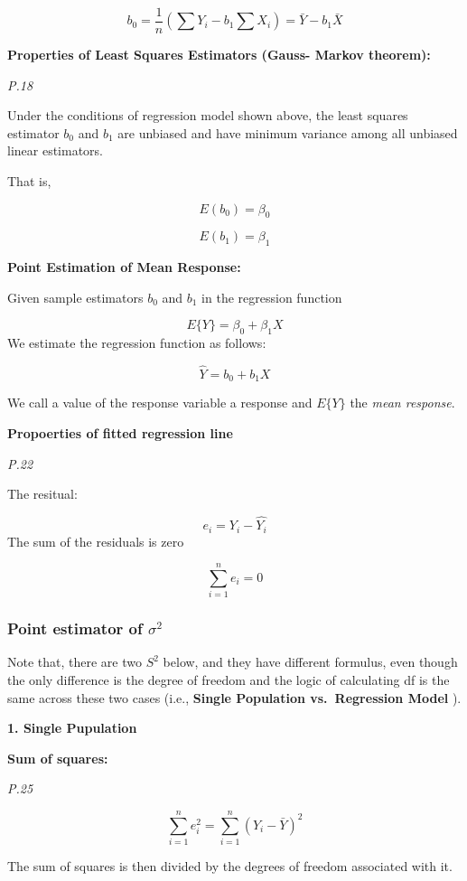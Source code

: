 \documentclass[]{book}
\begin{document}
\[b_0=\frac{1}{n}(\sum Y_i-b_1\sum X_i)=\bar{Y}-b_1\bar{X}\]

\textbf{Properties of Least Squares Estimators (Gauss- Markov theorem):}

\emph{P.18}

Under the conditions of regression model shown above, the least squares estimator \(b_0\) and \(b_1\) are unbiased and have minimum variance among all unbiased linear estimators.

That is,

\[E(b_0)=\beta_0\]

\[E(b_1)=\beta_1\]

\textbf{Point Estimation of Mean Response:}

Given sample estimators \(b_0\) and \(b_1\) in the regression function

\[E\{Y\}=\beta_0+\beta_1X\]
We estimate the regression function as follows:

\[\hat{Y}=b_0+b_1X\]

We call a value of the response variable a response and \(E\{Y\}\) the \emph{mean response}.

\textbf{Propoerties of fitted regression line}

\emph{P.22}

The resitual:

\[e_i=Y_i-\hat{Y_i}\]
The sum of the residuals is zero

\[\sum_{i=1}^n e_i=0\]

\hypertarget{point-estimator-of-sigma2}{%
\subsubsection{\texorpdfstring{Point estimator of \(\sigma^2\)}{Point estimator of \textbackslash sigma\^{}2}}\label{point-estimator-of-sigma2}}

Note that, there are two \(S^2\) below, and they have different formulus, even though the only difference is the degree of freedom and the logic of calculating df is the same across these two cases (i.e., \textbf{Single Population vs.~Regression Model} ).

\textbf{1. Single Pupulation}

\textbf{Sum of squares:}

\emph{P.25}

\[\sum_{i=1}^ne_i^2=\sum_{i=1}^n (Y_i-\bar{Y})^2\]

The sum of squares is then divided by the degrees of freedom associated with it.
\end{document}
